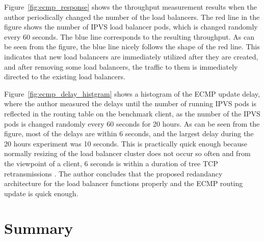 Figure~\ref{fig:ecmp_response} shows the throughput measurement results when the author periodically changed the number of the load balancers. 
The red line in the figure shows the number of IPVS load balancer pods, which is changed randomly every 60 seconds.
The blue line corresponds to the resulting throughput.
As can be seen from the figure, the blue line nicely follows the shape of the red line.
This indicates that new load balancers are immediately utilized after they are created, and after removing some load balancers, the traffic to them is immediately directed to the existing load balancers.

Figure~\ref{fig:ecmp_delay_histgram} shows a histogram of the ECMP update delay, where the author measured the delays until the number of running IPVS pods is reflected in the routing table on the benchmark client, as the number of the IPVS pods is changed randomly every 60 seconds for 20 hours.
As can be seen from the figure, most of the delays are within 6 seconds, and the largest delay during the 20 hours experiment was 10 seconds.
This is practically quick enough because normally resizing of the load balancer cluster does not occur so often and from the viewpoint of a client, 6 seconds is within a duration of tree TCP retransmissions \cite{rfc6298}.
The author concludes that the proposed redandancy architecture for the load balancer functions properly and the ECMP routing update is quick enough.

\FloatBarrier

\section{Summary}\label{Conclusions}


